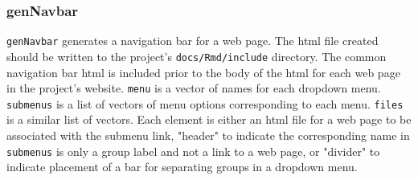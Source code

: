 \documentclass{article}\usepackage[]{graphicx}\usepackage[]{color}
\begin{document}
\title{}
\author{}
\maketitle





\subsubsection{genNavbar}

\texttt{genNavbar} generates a navigation bar for a web page.
The html file created should be written to the project's \texttt{docs/Rmd/include} directory.
The common navigation bar html is included prior to the body of the html for each web page in the project's website.
\texttt{menu} is a vector of names for each dropdown menu.
\texttt{submenus} is a list of vectors of menu options corresponding to each menu.
\texttt{files} is a similar list of vectors.
Each element is either an html file for a web page to be associated with the submenu link,
"header" to indicate the corresponding name in \texttt{submenus} is only a group label and not a link to a web page,
or "divider" to indicate placement of a bar for separating groups in a dropdown menu.
\end{document}
